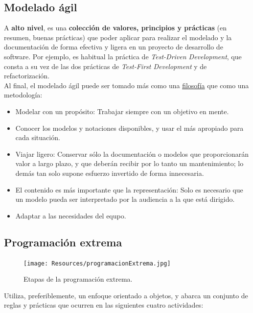 \subsection{Modelado ágil}

A \textbf{alto nivel}, es una \textbf{colección de valores, principios y prácticas} (en resumen, buenas prácticas) que poder aplicar para realizar el modelado y la documentación de forma efectiva y ligera en un proyecto de desarrollo de software. Por ejemplo, es habitual la práctica de \textit{Test-Driven Development}, que consta a su vez de las dos prácticas de \textit{Test-First Development} y de refactorización.\\

Al final, el modelado ágil puede ser tomado más como una \uline{filosofía} que como una metodología:

\begin{itemize}
   \item Modelar con un propósito: Trabajar siempre con un objetivo en mente.
   \item Conocer los modelos y notaciones disponibles, y usar el más apropiado para cada situación.
   \item Viajar ligero: Conservar sólo la documentación o modelos que proporcionarán valor a largo plazo, y que deberán recibir por lo tanto un mantenimiento; lo demás tan solo supone esfuerzo invertido de forma innecesaria.
   \item El contenido es más importante que la representación: Solo es necesario que un modelo pueda ser interpretado por la audiencia a la que está dirigido.
   \item Adaptar a las necesidades del equpo.
\end{itemize}

\subsection{Programación extrema}

\begin{figure}[H]
   \centering
   \texttt{[image: Resources/programacionExtrema.jpg]}
   \caption{Etapas de la programación extrema.}
   \label{fig:programacionExtrema}
\end{figure}

Utiliza, preferiblemente, un enfoque orientado a objetos, y abarca un conjunto de reglas y prácticas que ocurren en las siguientes cuatro actividades:

